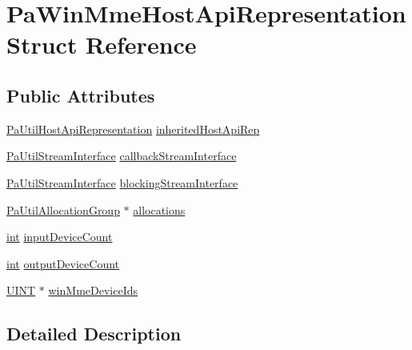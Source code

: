 \hypertarget{struct_pa_win_mme_host_api_representation}{}\section{Pa\+Win\+Mme\+Host\+Api\+Representation Struct Reference}
\label{struct_pa_win_mme_host_api_representation}
\subsection*{Public Attributes}
\begin{DoxyCompactItemize}
\item 
\hyperlink{struct_pa_util_host_api_representation}{Pa\+Util\+Host\+Api\+Representation} \hyperlink{struct_pa_win_mme_host_api_representation_aebc8a430de493c658fd81a8cdcb36927}{inherited\+Host\+Api\+Rep}
\item 
\hyperlink{struct_pa_util_stream_interface}{Pa\+Util\+Stream\+Interface} \hyperlink{struct_pa_win_mme_host_api_representation_a8baac4cae76ba97cd1d18453814556e7}{callback\+Stream\+Interface}
\item 
\hyperlink{struct_pa_util_stream_interface}{Pa\+Util\+Stream\+Interface} \hyperlink{struct_pa_win_mme_host_api_representation_a641c060de956bd991dd145296bbbca57}{blocking\+Stream\+Interface}
\item 
\hyperlink{struct_pa_util_allocation_group}{Pa\+Util\+Allocation\+Group} $\ast$ \hyperlink{struct_pa_win_mme_host_api_representation_a27118f61b075ffae1e2f4d95cc97c4ac}{allocations}
\item 
\hyperlink{xmltok_8h_a5a0d4a5641ce434f1d23533f2b2e6653}{int} \hyperlink{struct_pa_win_mme_host_api_representation_afeb61346a9e0d1a390f8fd9b9da73480}{input\+Device\+Count}
\item 
\hyperlink{xmltok_8h_a5a0d4a5641ce434f1d23533f2b2e6653}{int} \hyperlink{struct_pa_win_mme_host_api_representation_a59f729b5317014cc61a9957537010129}{output\+Device\+Count}
\item 
\hyperlink{mapinls_8h_a36cb3b01d81ffd844bbbfb54003e06ec}{U\+I\+NT} $\ast$ \hyperlink{struct_pa_win_mme_host_api_representation_a8ebc9f7c215b507c2bf85fb309f4b0f8}{win\+Mme\+Device\+Ids}
\end{DoxyCompactItemize}


\subsection{Detailed Description}


